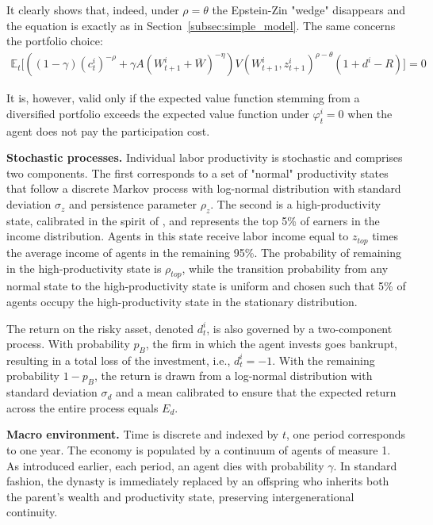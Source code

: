 \documentclass[12pt]{article}
\begin{document}
It clearly shows that, indeed, under $\rho = \theta$ the Epstein-Zin "wedge" disappears and the equation is exactly as in Section~\ref{subsec:simple_model}. The same concerns the portfolio choice:
\begin{align*}
\mathbb{E}_t \Bigg[
    \left( 
        (1 - \gamma) \left(c_t^i\right)^{-\rho} 
        + \gamma A\left(W_{t+1}^i + \overline{W} \right)^{-\eta} 
    \right)
    V\left(W_{t+1}^i, z_{t+1}^i\right)^{\rho - \theta}
    \left(1 + d^i - R \right)
\Bigg] = 0 \label{eq:ret_cond}
\end{align*}

It is, however, valid only if the expected value function stemming from a diversified portfolio exceeds the expected value function under $\varphi_t^i=0$ when the agent does not pay the participation cost.

\textbf{Stochastic processes.} Individual labor productivity is stochastic and comprises two components. The first corresponds to a set of "normal" productivity states that follow a discrete Markov process with log-normal distribution with standard deviation $\sigma_z$ and persistence parameter $\rho_z$. The second is a high-productivity state, calibrated in the spirit of \textcite{castaneda2003}, and represents the top 5\% of earners in the income distribution. Agents in this state receive labor income equal to $z_{top}$ times the average income of agents in the remaining 95\%. The probability of remaining in the high-productivity state is $\rho_{top}$, while the transition probability from any normal state to the high-productivity state is uniform and chosen such that 5\% of agents occupy the high-productivity state in the stationary distribution.

The return on the risky asset, denoted $d_t^i$, is also governed by a two-component process. With probability $p_B$, the firm in which the agent invests goes bankrupt, resulting in a total loss of the investment, i.e., $d_t^i = -1$. With the remaining probability $1 - p_B$, the return is drawn from a log-normal distribution with standard deviation $\sigma_d$ and a mean calibrated to ensure that the expected return across the entire process equals $E_d$.

\textbf{Macro environment.} Time is discrete and indexed by $t$, one period corresponds to one year. The economy is populated by a continuum of agents of measure 1. As introduced earlier, each period, an agent dies with probability $\gamma$. In standard fashion, the dynasty is immediately replaced by an offspring who inherits both the parent’s wealth and productivity state, preserving intergenerational continuity.
\end{document}
